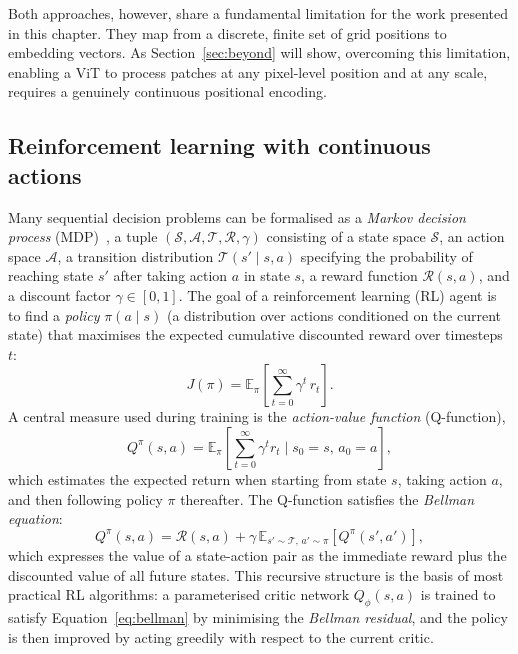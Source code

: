 Both approaches, however, share a fundamental limitation for the work presented in this chapter. They map from a discrete, finite set of grid positions to embedding vectors. As Section~\ref{sec:beyond} will show, overcoming this limitation, enabling a ViT to process patches at any pixel-level position and at any scale, requires a genuinely continuous positional encoding.

\subsection{Reinforcement learning with continuous actions}
\label{sec:prelim-rl}

Many sequential decision problems can be formalised as a \emph{Markov decision process} (MDP)~\cite{sutton2018reinforcement}, a tuple $(\mathcal{S}, \mathcal{A}, \mathcal{T}, \mathcal{R}, \gamma)$ consisting of a state space $\mathcal{S}$, an action space $\mathcal{A}$, a transition distribution $\mathcal{T}(s' \mid s, a)$ specifying the probability of reaching state $s'$ after taking action $a$ in state $s$, a reward function $\mathcal{R}(s, a)$, and a discount factor $\gamma \in [0, 1]$. The goal of a reinforcement learning (RL) agent is to find a \emph{policy} $\pi(a \mid s)$ (a distribution over actions conditioned on the current state) that maximises the expected cumulative discounted reward over timesteps $t$:
\begin{equation}
    J(\pi) = \mathbb{E}_{\pi}\!\left[\sum_{t=0}^{\infty} \gamma^t\, r_t\right].
    \label{eq:rl-objective}
\end{equation}
A central measure used during training is the \emph{action-value function} (Q-function),
\begin{equation}
    Q^\pi(s, a) = \mathbb{E}_{\pi}\!\left[\sum_{t=0}^{\infty} \gamma^t r_t \mid s_0 = s,\, a_0 = a\right],
\end{equation}
which estimates the expected return when starting from state $s$, taking action $a$, and then following policy $\pi$ thereafter. The Q-function satisfies the \emph{Bellman equation}:
\begin{equation}
    Q^\pi(s, a) = \mathcal{R}(s,a) + \gamma\, \mathbb{E}_{s' \sim \mathcal{T},\, a' \sim \pi}\!\left[Q^\pi(s', a')\right],
    \label{eq:bellman}
\end{equation}
which expresses the value of a state-action pair as the immediate reward plus the discounted value of all future states. This recursive structure is the basis of most practical RL algorithms: a parameterised critic network $Q_\phi(s, a)$ is trained to satisfy Equation~\ref{eq:bellman} by minimising the \emph{Bellman residual}, and the policy is then improved by acting greedily with respect to the current critic.

